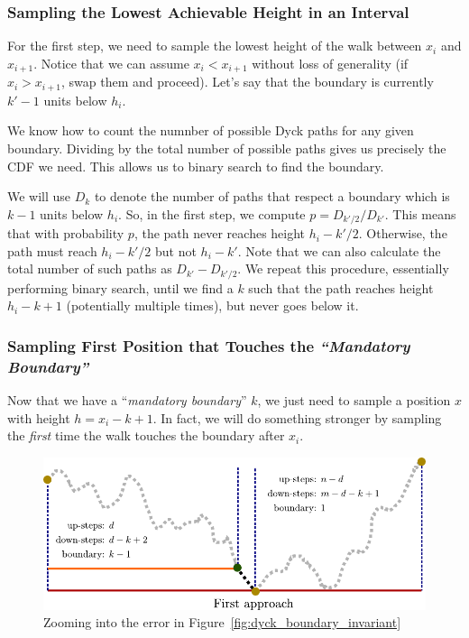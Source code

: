 \subsubsection{Sampling the Lowest Achievable Height in an Interval}%
\label{sec:sampling_the_lowest_achievable_height}
For the first step, we need to sample the lowest height of the walk between $x_i$ and $x_{i+1}$.
Notice that we can assume $x_i < x_{i+1}$ without loss of generality (if $x_i > x_{i+1}$, swap them and proceed).
Let's say that the boundary is currently $k'-1$ units below $h_i$.

We know how to count the numnber of possible Dyck paths for any given boundary.
Dividing by the total number of possible paths gives us precisely the CDF we need.
This allows us to binary search to find the boundary.

We will use $D_{k}$ to denote the number of paths that respect a boundary which is $k-1$ units below $h_i$.
So, in the first step, we compute $p = D_{k'/2}/D_{k'}$.
This means that with probability $p$, the path never reaches height $h_i - k'/2$.
Otherwise, the path must reach $h_i-k'/2$ but not $h_i-k'$.
Note that we can also calculate the total number of such paths as $D_{k'} - D_{k'/2}$.
We repeat this procedure, essentially performing binary search,
until we find a $k$ such that the path reaches height $h_i-k+1$ (potentially multiple times), but never goes below it.



\subsubsection{Sampling First Position that Touches the \emph{``Mandatory Boundary''}}%
\label{sec:sampling_first_position_touching_mandatory_boundary}

Now that we have a ``\emph{mandatory boundary}'' $k$, we just need to sample a position $x$ with height $h = x_i-k+1$.
In fact, we will do something stronger by sampling the \emph{first} time the walk touches the boundary after $x_i$.
\begin{figure}[htpb]
    \centering
    \includegraphics[width=\textwidth]{images/dyck_first_approach_sampling.pdf}
    \caption{Zooming into the error in Figure~\ref{fig:dyck_boundary_invariant}}
    \label{fig:dyck_first_approach_sampling}
\end{figure}


